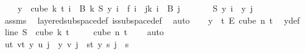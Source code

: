 \begin{isabellebody}
\ \ \ \ {\isachardoublequoteopen}{\isacharparenleft}{\kern0pt}{\isasymforall}y\ {\isasymin}\ cube\ k\ {\isacharparenleft}{\kern0pt}t{\isacharplus}{\kern0pt}{}{\isacharparenright}{\kern0pt}{\isachardot}{\kern0pt}\ {\isacharparenleft}{\kern0pt}{\isasymforall}i\ {\isasymin}\ B\ k{\isachardot}{\kern0pt}\ S\ y\ i\ {\isacharequal}{\kern0pt}\ f\ i{\isacharparenright}{\kern0pt}\ {\isasymand}\ {\isacharparenleft}{\kern0pt}{\isasymforall}j{\isacharless}{\kern0pt}k{\isachardot}{\kern0pt}\ {\isasymforall}i\ {\isasymin}\ B\ j{\isachardot}{\kern0pt}\ \isanewline
\ \ \ \ \ \ {\isacharparenleft}{\kern0pt}S\ y{\isacharparenright}{\kern0pt}\ i\ {\isacharequal}{\kern0pt}\ y\ j{\isacharparenright}{\kern0pt}{\isacharparenright}{\kern0pt}{\isachardoublequoteclose}\ \isanewline
\ \ \ \ \ \ \isamarkupfalse%
\ assms{\isacharparenleft}{\kern0pt}{}{\isacharparenright}{\kern0pt}\ \isamarkupfalse%
\ layered{\isacharunderscore}{\kern0pt}subspace{\isacharunderscore}{\kern0pt}def\ is{\isacharunderscore}{\kern0pt}subspace{\isacharunderscore}{\kern0pt}def\ \isamarkupfalse%
\ auto\isanewline
\isanewline
\ \ \isamarkupfalse%
\ {\isachardoublequoteopen}y\ {\isasymin}\ {\isacharbraceleft}{\kern0pt}{\isachardot}{\kern0pt}{\isachardot}{\kern0pt}{\isacharless}{\kern0pt}t{\isacharplus}{\kern0pt}{}{\isacharbraceright}{\kern0pt}\ {\isasymrightarrow}\isactrlsub E\ cube\ n\ {\isacharparenleft}{\kern0pt}t{\isacharplus}{\kern0pt}{}{\isacharparenright}{\kern0pt}{\isachardoublequoteclose}\ \isamarkupfalse%
\ y{\isacharunderscore}{\kern0pt}def\ \isamarkupfalse%
\ line{}\ {\isacartoucheopen}S\ {\isacharbackquote}{\kern0pt}\ cube\ k\ {\isacharparenleft}{\kern0pt}t\ {\isacharplus}{\kern0pt}\ {}{\isacharparenright}{\kern0pt}\isanewline
\ \ {\isasymsubseteq}\ cube\ n\ {\isacharparenleft}{\kern0pt}t\ {\isacharplus}{\kern0pt}\ {}{\isacharparenright}{\kern0pt}{\isacartoucheclose}\ \isamarkupfalse%
\ auto\isanewline
\ \ \isamarkupfalse%
\ \isamarkupfalse%
\ {\isachardoublequoteopen}{\isacharparenleft}{\kern0pt}{\isasymforall}u{\isacharless}{\kern0pt}t{\isacharplus}{\kern0pt}{}{\isachardot}{\kern0pt}\ {\isasymforall}v{\isacharless}{\kern0pt}t{\isacharplus}{\kern0pt}{}{\isachardot}{\kern0pt}\ y\ u\ j\ {\isacharequal}{\kern0pt}\ y\ v\ j{\isacharparenright}{\kern0pt}\ {\isasymor}\ {\isacharparenleft}{\kern0pt}{\isasymforall}s{\isacharless}{\kern0pt}t{\isacharplus}{\kern0pt}{}{\isachardot}{\kern0pt}\ y\ s\ j\ {\isacharequal}{\kern0pt}\ s{\isacharparenright}{\kern0pt}{\isachardoublequoteclose}\ \isanewline

\end{isabellebody}
